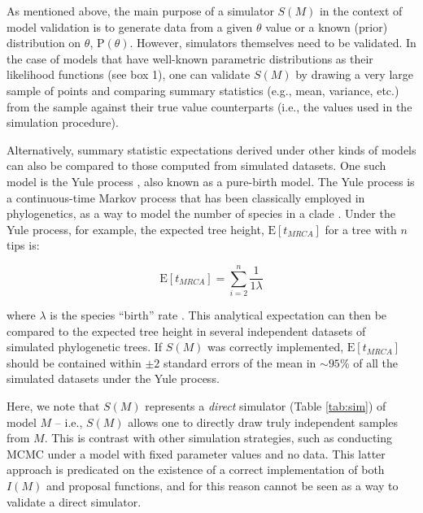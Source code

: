 \documentclass[oneside]{article}
\begin{document}
As mentioned above, the main purpose of a simulator $S(M)$ in the
context of model validation is to generate data from a given $\theta$
value or a known (prior) distribution on $\theta$, $\text{P}(\theta)$.
However, simulators themselves need to be validated.
In the case of models that have well-known parametric distributions as their
likelihood functions (see box 1), one can validate $S(M)$ by
drawing a very large sample of points and comparing summary statistics
(e.g., mean, variance, etc.) from the sample against their true value
counterparts (i.e., the values used in the simulation procedure). 

Alternatively, summary statistic expectations derived under other
kinds of models can also be compared to those computed from simulated datasets.
One such model is the Yule process \citep{yule24}, also known as a pure-birth model.
The Yule process is a continuous-time Markov process that has been
classically employed in phylogenetics, as a way to model the number of
species in a clade \citep{yule24,aldous01}.
Under the Yule process, for example, the expected tree height,
$\text{E}[t_{MRCA}]$ for a tree with $n$ tips is:

\begin{equation}
  \text{E}[t_{MRCA}] = \sum_{i=2}^{n}\frac{1}{1\lambda}
  \label{eq:yule}
\end{equation}

\noindent where $\lambda$ is the species ``birth'' rate \citep{yule24}.
This analytical expectation can then be compared to the expected tree
height in several independent datasets of simulated phylogenetic trees.
If $S(M)$ was correctly implemented, $\text{E}[t_{MRCA}]$ should be contained within $\pm 2$ standard errors of
the mean in $\sim 95\%$ of all the simulated datasets under the Yule process.

Here, we note that $S(M)$ represents a \emph{direct} simulator (Table
\ref{tab:sim}) of model
$M$ -- i.e., $S(M)$ allows one to directly draw truly independent
samples from $M$.
This is contrast with other simulation strategies, such as conducting
MCMC under a model with fixed parameter values and no data.
This latter approach is predicated on the existence of a correct
implementation of both $I(M)$ and proposal functions, and for this
reason cannot be seen as a way to validate a direct simulator.
\end{document}
